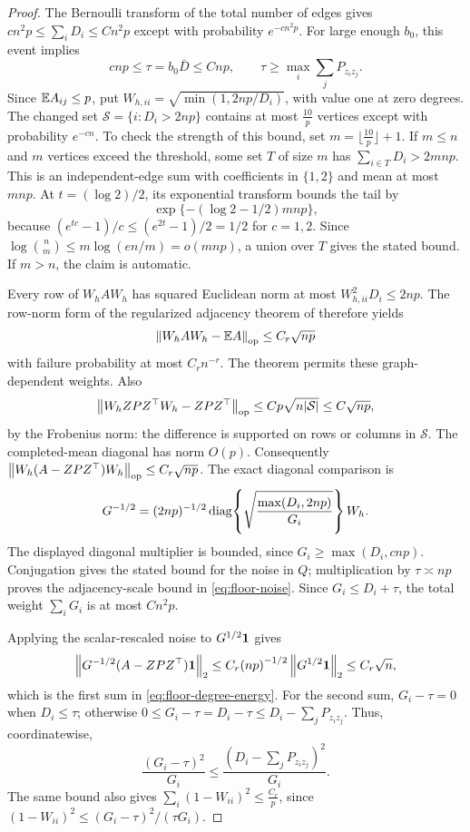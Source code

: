 \begin{proof}
The Bernoulli transform of the total number of edges gives
$c{n^2p}\le\sum_iD_i\le C{n^2p}$ except with probability $e^{-c{n^2p}}$.
For large enough $b_0$, this event implies
\[
 c{np}\le\tau=b_0\bar D\le C{np},
 \qquad \tau\ge\max_i\sum_jP_{z_i z_j}.
\]
Since $\mathbb E A_{ij}\le p$, put
$W_{h,ii}=\sqrt{\min(1,2{np}/D_i)}$, with value one at zero degrees.
The changed set $\mathcal S=\{i:D_i>2{np}\}$ contains at most
$\frac{10}{p}$ vertices except with probability $e^{-cn}$. To check the
strength of this bound, set $m=\lfloor\frac{10}{p}\rfloor+1$. If $m\le n$
and $m$ vertices exceed the threshold, some set $T$ of size $m$ has
$\sum_{i\in T}D_i>2m{np}$. This is an independent-edge sum with
coefficients in $\{1,2\}$ and mean at most $m{np}$. At
$t=(\log2)/2$, its exponential transform bounds the tail by
\[
 \exp\{-(\log2-1/2)m{np}\},
\]
because $(e^{tc}-1)/c\le(e^{2t}-1)/2=1/2$ for $c=1,2$.
Since $\log\binom nm\le m\log(en/m)=o(m{np})$, a union over $T$
gives the stated bound. If $m>n$, the claim is automatic.

Every row of $W_hAW_h$ has squared Euclidean norm at most
$W_{h,ii}^2D_i\le2{np}$. The row-norm form of the regularized adjacency
theorem of \citet[Theorem 2.1 and Remark 2.2]{llv2017} therefore yields
\[
 \left\lVert W_hAW_h-\mathbb E A\right\rVert_{\mathrm{op}}\le C_r\sqrt {np}
\]
with failure probability at most $C_rn^{-r}$. The theorem permits
these graph-dependent weights. Also
\[
 \left\lVert W_h{ZPZ^\top} W_h-{ZPZ^\top}\right\rVert_{\mathrm{op}}
 \le Cp\sqrt{n|\mathcal S|}\le C\sqrt {np},
\]
by the Frobenius norm: the difference is supported on rows or columns
in $\mathcal S$. The completed-mean diagonal has norm $O(p)$.
Consequently $\left\lVert W_h(A-{ZPZ^\top})W_h\right\rVert_{\mathrm{op}}\le C_r\sqrt {np}$.
The exact diagonal comparison is
\[
 G^{-1/2}=(2{np})^{-1/2}
 \operatorname{diag}\!\left\{\sqrt{\frac{\max(D_i,2{np})}{G_i}}\right\}W_h.
\]
The displayed diagonal multiplier is bounded, since
$G_i\ge\max(D_i,c{np})$.
Conjugation gives the stated bound for the noise in $Q$;
multiplication by $\tau\asymp {np}$ proves the adjacency-scale bound
in \eqref{eq:floor-noise}. Since $G_i\le D_i+\tau$, the total
weight $\sum_iG_i$ is at most $C{n^2p}$.

Applying the scalar-rescaled noise to $G^{1/2}\mathbf 1$ gives
\[
 \left\lVert G^{-1/2}(A-{ZPZ^\top})\mathbf 1\right\rVert_2
 \le C_r{(np)}^{-1/2}\left\lVert G^{1/2}\mathbf 1\right\rVert_2\le C_r\sqrt n,
\]
which is the first sum in \eqref{eq:floor-degree-energy}.
For the second sum, $G_i-\tau=0$ when $D_i\le\tau$; otherwise
$0\le G_i-\tau=D_i-\tau\le D_i-\sum_jP_{z_i z_j}$. Thus, coordinatewise,
\[
 \frac{(G_i-\tau)^2}{G_i}
 \le\frac{(D_i-\sum_jP_{z_i z_j})^2}{G_i}.
\]
The same bound also gives
$\sum_i(1-W_{ii})^2\le \frac{C_r}{p}$, since
$(1-W_{ii})^2\le(G_i-\tau)^2/(\tau G_i)$.


\end{proof}
